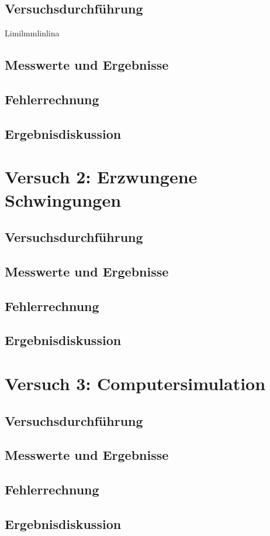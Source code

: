\documentclass{scrartcl}
\begin{document}
\subsection{Versuchsdurchführung}
Limilmmlinlina
\subsection{Messwerte und Ergebnisse}

\subsection{Fehlerrechnung}

\subsection{Ergebnisdiskussion}



\section{Versuch 2: Erzwungene Schwingungen}
\subsection{Versuchsdurchführung}

\subsection{Messwerte und Ergebnisse}

\subsection{Fehlerrechnung}

\subsection{Ergebnisdiskussion}



\section{Versuch 3: Computersimulation}
\subsection{Versuchsdurchführung}

\subsection{Messwerte und Ergebnisse}

\subsection{Fehlerrechnung}

\subsection{Ergebnisdiskussion}
\end{document}
